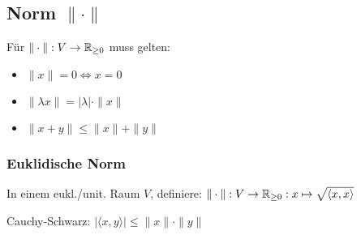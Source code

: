 \subsection*{Norm $\|\cdot\|$}
Für $\|\cdot\|:V\to\mathbb{R}_{\ge 0}$ muss gelten:
\begin{itemize}
	\item $\|x\| = 0 \iff x = 0$
	\item $\|\lambda x\|=|\lambda|\cdot\|x\|$
	\item $\|x+y\| \le \|x\| + \|y\|$
\end{itemize}

\subsubsection*{Euklidische Norm}
In einem eukl./unit. Raum $V$, definiere:
$\|\cdot\|: V\to\mathbb{R}_{\ge0}:x\mapsto \sqrt{\langle x,x \rangle}$

Cauchy-Schwarz: $|\langle x,y \rangle| \le \|x\| \cdot \|y\|$
